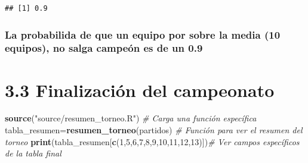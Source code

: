 \documentclass[]{article}
\newenvironment{Shaded}{\begin{snugshade}}{\end{snugshade}}
\newcommand{\CommentTok}[1]{\textcolor[rgb]{0.56,0.35,0.01}{\textit{#1}}}
\newcommand{\DecValTok}[1]{\textcolor[rgb]{0.00,0.00,0.81}{#1}}
\newcommand{\KeywordTok}[1]{\textcolor[rgb]{0.13,0.29,0.53}{\textbf{#1}}}
\newcommand{\NormalTok}[1]{#1}
\newcommand{\StringTok}[1]{\textcolor[rgb]{0.31,0.60,0.02}{#1}}
\begin{document}
\begin{verbatim}
## [1] 0.9
\end{verbatim}

\hypertarget{la-probabilida-de-que-un-equipo-por-sobre-la-media-10-equipos-no-salga-campeon-es-de-un-0.9}{%
\subsubsection{La probabilida de que un equipo por sobre la media (10
equipos), no salga campeón es de un
0.9}\label{la-probabilida-de-que-un-equipo-por-sobre-la-media-10-equipos-no-salga-campeon-es-de-un-0.9}}

\hypertarget{finalizacion-del-campeonato}{%
\section{3.3 Finalización del
campeonato}\label{finalizacion-del-campeonato}}

\begin{Shaded}
\begin{Highlighting}[numbers=left,,]
\KeywordTok{source}\NormalTok{(}\StringTok{"source/resumen_torneo.R"}\NormalTok{) }\CommentTok{# Carga una función específica}
\NormalTok{tabla_resumen=}\KeywordTok{resumen_torneo}\NormalTok{(partidos) }\CommentTok{# Función para ver el resumen del torneo}
\KeywordTok{print}\NormalTok{(tabla_resumen[}\KeywordTok{c}\NormalTok{(}\DecValTok{1}\NormalTok{,}\DecValTok{5}\NormalTok{,}\DecValTok{6}\NormalTok{,}\DecValTok{7}\NormalTok{,}\DecValTok{8}\NormalTok{,}\DecValTok{9}\NormalTok{,}\DecValTok{10}\NormalTok{,}\DecValTok{11}\NormalTok{,}\DecValTok{12}\NormalTok{,}\DecValTok{13}\NormalTok{)])}\CommentTok{# Ver campos específicos de la tabla final}
\end{Highlighting}
\end{Shaded}
\end{document}
